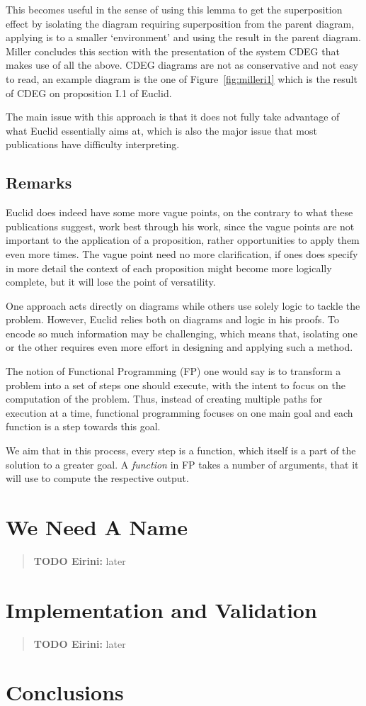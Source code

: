\documentclass[]{interact}
\theoremstyle{plain}
\theoremstyle{definition}
\theoremstyle{remark}
\newcommand{\quotes}[1]{`#1'}
\newcommand{\comment}[2]
{
\begin{quote}
\textbf{#1:}
     #2
\end{quote}
}
\begin{document}
This becomes useful in the sense of using this lemma to get the
superposition effect by isolating the diagram requiring superposition
from the parent diagram, applying is to a smaller \quotes{environment}
and using the result in the parent diagram. Miller concludes this
section with the presentation of the system CDEG that makes use of all
the above. CDEG diagrams are not as conservative and not easy to read,
an example diagram is the one of Figure~\ref{fig:milleri1} which is
the result of CDEG on proposition I.1 of Euclid.

The main issue with this approach is that it does not fully take
advantage of what Euclid essentially aims at, which is also the major
issue that most publications have difficulty interpreting.


\subsection{Remarks}

Euclid does indeed have some more vague points, on the contrary to
what these publications suggest, work best through his work, since the
vague points are not important to the application of a proposition,
rather opportunities to apply them even more times. The vague point
need no more clarification, if ones does specify in more detail the
context of each proposition might become more logically complete, but
it will lose the point of versatility.

One approach acts directly on diagrams
while others use solely logic to tackle the
problem. However, Euclid relies both on diagrams and logic in his
proofs. To encode so much information may be challenging, which means
that, isolating one or the other requires even more effort in
designing and applying such a method.



The notion of Functional Programming (FP) one would say is to
transform a problem into a set of steps one should 
execute, with the intent to focus on the computation of the problem.
Thus, instead of creating multiple paths for execution at a time,
functional programming focuses on one main goal and each function 
is a step towards this goal.

We aim that in this process, every step is a function, which 
itself is a part of the solution to a greater goal. A \textit{function} in 
FP takes a number of arguments, that it will use to compute the 
respective output. 



\section{We Need A Name}
\label{sec:foreground}

\comment{TODO Eirini}{later}


\section{Implementation and Validation}
\label{sec:impl}
\label{sec:eval}

\comment{TODO Eirini}{later}


\section{Conclusions}
\label{sec:conc}



\end{document}
